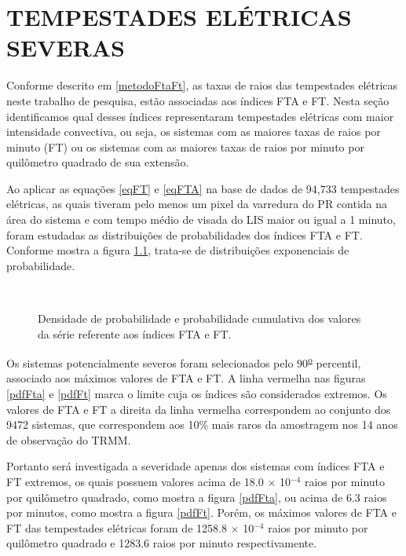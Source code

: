 \chapter{TEMPESTADES ELÉTRICAS SEVERAS}





Conforme descrito em \ref{metodoFtaFt}, as taxas de raios das tempestades elétricas neste trabalho de pesquisa, estão associadas aos índices FTA e FT.  Nesta seção identificamos qual desses índices representaram tempestades elétricas com maior intensidade convectiva, ou seja, os sistemas com as maiores taxas de raios por minuto (FT) ou os sistemas com as maiores taxas de raios por minuto por quilômetro quadrado de sua extensão. 

Ao aplicar as equações \ref{eqFT} e \ref{eqFTA} na base de dados de 94,733 tempestades elétricas, as quais tiveram pelo menos um pixel da varredura do PR contida na área do sistema e com tempo médio de visada do LIS maior ou igual a 1 minuto, foram estudadas as distribuições de probabilidades dos índices FTA e FT. Conforme mostra a figura \ref{seriesFtaFt}, trata-se de distribuições exponenciais de probabilidade. 

\begin{figure}[!hb]
  \centering 
   \\
  \caption{Densidade de probabilidade e probabilidade cumulativa dos valores da série referente aos índices FTA e FT.}
  \label{seriesFtaFt}
\end{figure}

Os sistemas potencialmente severos foram selecionados pelo 90\textsuperscript{\underline{o}} percentil, associado aos máximos valores de FTA e FT. A linha vermelha nas figuras \ref{pdfFta} e \ref{pdfFt} marca o limite cuja os índices são considerados extremos. Os valores de FTA e FT a direita da linha vermelha correspondem ao conjunto dos 9472 sistemas, que correspondem aos 10\% mais raros da amostragem nos 14 anos de observação do TRMM.  

Portanto será investigada a severidade apenas dos sistemas com índices FTA e FT extremos, os quais possuem valores acima de 18.0 $\times$ 10$^{-4}$ raios por minuto por quilômetro quadrado, como mostra a figura \ref{pdfFta}, ou acima de 6.3 raios por minutos, como mostra a figura \ref{pdfFt}. Porém, os máximos valores de FTA e FT das tempestades elétricas foram de 1258.8 $\times$ 10$^{-4}$ raios por minuto por quilômetro quadrado e 1283.6 raios por minuto respectivamente. 


